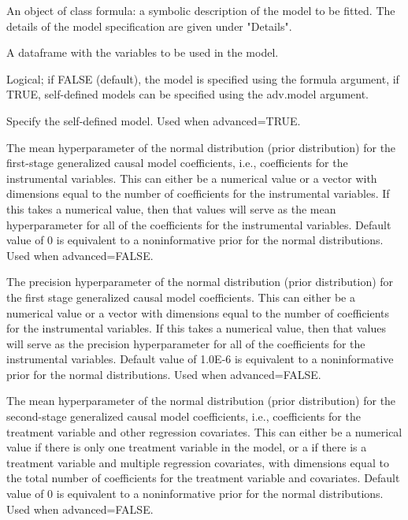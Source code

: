 \documentclass[a4paper]{book}
\begin{document}
\begin{Arguments}
\begin{ldescription}
\item[\code{formula}] An object of class formula: a symbolic description of the model to be fitted.
The details of the model specification are given under "Details".

\item[\code{data}] A dataframe with the variables to be used in the model.

\item[\code{advanced}] Logical; if FALSE (default), the model is specified using the formula argument,
if TRUE, self-defined models can be specified using the adv.model argument.

\item[\code{adv.model}] Specify the self-defined model. Used when advanced=TRUE.

\item[\code{b0}] The mean hyperparameter of the normal distribution (prior distribution)
for the first-stage generalized causal model coefficients, i.e., coefficients for the instrumental variables.
This can either be a numerical value or a vector with dimensions equal to the number of coefficients
for the instrumental variables. If this takes a numerical value, then that values will
serve as the mean hyperparameter for all of the coefficients for the instrumental variables.
Default value of 0 is equivalent to a noninformative prior for the normal distributions.
Used when advanced=FALSE.

\item[\code{B0}] The precision hyperparameter of the normal distribution (prior distribution)
for the first stage generalized causal model coefficients.
This can either be a numerical value or a vector with dimensions equal to the number of coefficients
for the instrumental variables. If this takes a numerical value, then that values will
serve as the precision hyperparameter for all of the coefficients for the instrumental variables.
Default value of 1.0E-6 is equivalent to a noninformative prior for the normal distributions.
Used when advanced=FALSE.

\item[\code{g0}] The mean hyperparameter of the normal distribution (prior distribution)
for the second-stage generalized causal model coefficients,
i.e., coefficients for the treatment variable and other regression covariates.
This can either be a numerical value if there is only one treatment variable in the model,
or a if there is a treatment variable and multiple regression covariates,
with dimensions equal to the total number of coefficients for the treatment variable and covariates.
Default value of 0 is equivalent to a noninformative prior for the normal distributions.
Used when advanced=FALSE.


\end{ldescription}
\end{Arguments}
\end{document}
